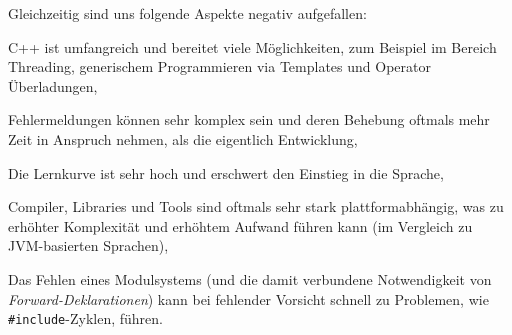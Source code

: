 Gleichzeitig sind uns folgende Aspekte negativ aufgefallen:
\begin{sitemize}{-0.3cm}
  \item C++ ist umfangreich und bereitet viele Möglichkeiten, zum Beispiel im
  Bereich Threading, generischem Programmieren via Templates und Operator
  Überladungen,
  \item Fehlermeldungen können sehr komplex sein und deren Behebung oftmals mehr
  Zeit in Anspruch nehmen, als die eigentlich Entwicklung,
  \item Die Lernkurve ist sehr hoch und erschwert den Einstieg in die Sprache,
  \item Compiler, Libraries und Tools sind oftmals sehr stark plattformabhängig,
  was zu erhöhter Komplexität und erhöhtem Aufwand führen kann (im Vergleich
  zu JVM-basierten Sprachen),
  \item Das Fehlen eines Modulsystems (und die damit verbundene Notwendigkeit
  von \emph{Forward-Deklarationen}) kann bei fehlender Vorsicht schnell zu
  Problemen, wie \texttt{#include}-Zyklen, führen.
\end{sitemize}
